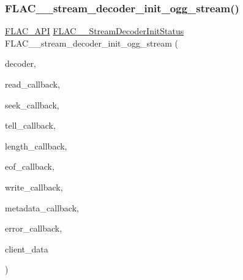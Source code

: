 \subsubsection{\texorpdfstring{FLAC\_\_stream\_decoder\_init\_ogg\_stream()}{FLAC\_\_stream\_decoder\_init\_ogg\_stream()}}
{\footnotesize\ttfamily \mbox{\hyperlink{group__flac__export_ga56ca07df8a23310707732b1c0007d6f5}{F\+L\+A\+C\+\_\+\+A\+PI}} \mbox{\hyperlink{group__flac__stream__decoder_gaaed54a24ac6310d29c5cafba79759c44}{F\+L\+A\+C\+\_\+\+\_\+\+Stream\+Decoder\+Init\+Status}} F\+L\+A\+C\+\_\+\+\_\+stream\+\_\+decoder\+\_\+init\+\_\+ogg\+\_\+stream (\begin{DoxyParamCaption}\item[{\mbox{\hyperlink{struct_f_l_a_c_____stream_decoder}{F\+L\+A\+C\+\_\+\+\_\+\+Stream\+Decoder}} $\ast$}]{decoder,  }\item[{\mbox{\hyperlink{group__flac__stream__decoder_ga25d4321dc2f122d35ddc9061f44beae7}{F\+L\+A\+C\+\_\+\+\_\+\+Stream\+Decoder\+Read\+Callback}}}]{read\+\_\+callback,  }\item[{\mbox{\hyperlink{group__flac__stream__decoder_ga4c18b0216e0f7a83d7e4e7001230545d}{F\+L\+A\+C\+\_\+\+\_\+\+Stream\+Decoder\+Seek\+Callback}}}]{seek\+\_\+callback,  }\item[{\mbox{\hyperlink{group__flac__stream__decoder_gafdf1852486617a40c285c0d76d451a5a}{F\+L\+A\+C\+\_\+\+\_\+\+Stream\+Decoder\+Tell\+Callback}}}]{tell\+\_\+callback,  }\item[{\mbox{\hyperlink{group__flac__stream__decoder_ga5363f3b46e3f7d6a73385f6560f7e7ef}{F\+L\+A\+C\+\_\+\+\_\+\+Stream\+Decoder\+Length\+Callback}}}]{length\+\_\+callback,  }\item[{\mbox{\hyperlink{group__flac__stream__decoder_ga4eac094fc609363532d90cf8374b4f7e}{F\+L\+A\+C\+\_\+\+\_\+\+Stream\+Decoder\+Eof\+Callback}}}]{eof\+\_\+callback,  }\item[{\mbox{\hyperlink{group__flac__stream__decoder_ga61e48dc2c0d2f6c5519290ff046874a4}{F\+L\+A\+C\+\_\+\+\_\+\+Stream\+Decoder\+Write\+Callback}}}]{write\+\_\+callback,  }\item[{\mbox{\hyperlink{group__flac__stream__decoder_ga6aa87c01744c1c601b7f371f627b6e14}{F\+L\+A\+C\+\_\+\+\_\+\+Stream\+Decoder\+Metadata\+Callback}}}]{metadata\+\_\+callback,  }\item[{\mbox{\hyperlink{group__flac__stream__decoder_gac896ee6a12668e9015fab4fbc6aae996}{F\+L\+A\+C\+\_\+\+\_\+\+Stream\+Decoder\+Error\+Callback}}}]{error\+\_\+callback,  }\item[{\mbox{\hyperlink{_s_d_l__opengles2__gl2ext_8h_ae5d8fa23ad07c48bb609509eae494c95}{void}} $\ast$}]{client\+\_\+data }\end{DoxyParamCaption})}

